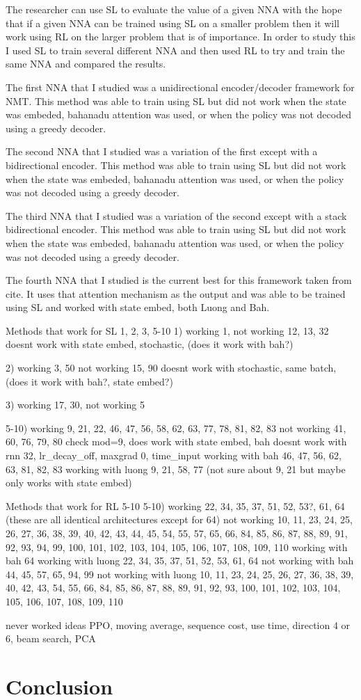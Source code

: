 \documentclass[12pt]{article}
\begin{document}
The researcher can use SL to evaluate the value of a given NNA with the hope that if a given NNA can be trained using SL on a smaller problem then it will work using RL on the larger problem that is of importance. In order to study this I used SL to train several different NNA and then used RL to try and train the same NNA and compared the results.

The first NNA that I studied was a unidirectional encoder/decoder framework for NMT. This method was able to train using SL but did not work when the state was embeded, bahanadu attention was used, or when the policy was not decoded using a greedy decoder.

The second NNA that I studied was a variation of the first except with a bidirectional encoder. This method was able to train using SL but did not work when the state was embeded, bahanadu attention was used, or when the policy was not decoded using a greedy decoder.

The third NNA that I studied was a variation of the second except with a stack bidirectional encoder. This method was able to train using SL but did not work when the state was embeded, bahanadu attention was used, or when the policy was not decoded using a greedy decoder.

The fourth NNA that I studied is the current best for this framework taken from cite. It uses that attention mechanism as the output and was able to be trained using SL and worked with state embed, both Luong and Bah.

Methods that work for SL 1, 2, 3, 5-10
1)
working 1,
not working 12, 13, 32
doesnt work with state embed, stochastic, (does it work with bah?)

2)
working 3, 50
not working 15, 90
doesnt work with stochastic, same batch, (does it work with bah?, state embed?)

3)
working 17, 30,
not working 5

5-10)
working 9, 21, 22, 46, 47, 56, 58, 62, 63, 77, 78, 81, 82, 83
not working 41, 60, 76, 79, 80
check mod=9, does work with state embed, bah
doesnt work with rnn 32, lr_decay_off, maxgrad 0, time_input
working with bah 46, 47, 56, 62, 63, 81, 82, 83
working with luong 9, 21, 58, 77 (not sure about 9, 21 but maybe only works with state embed)

Methods that work for RL 5-10
5-10)
working 22, 34, 35, 37, 51, 52, 53?, 61, 64 (these are all identical architectures except for 64)
not working 10, 11, 23, 24, 25, 26, 27, 36, 38, 39, 40, 42, 43, 44, 45, 54, 55, 57, 65, 66, 84, 85, 86, 87, 88, 89, 91, 92, 93, 94, 99, 100, 101, 102, 103, 104, 105, 106, 107, 108, 109, 110
working with bah 64
working with luong 22, 34, 35, 37, 51, 52, 53, 61, 64
not working with bah 44, 45, 57, 65, 94, 99
not working with luong 10, 11, 23, 24, 25, 26, 27, 36, 38, 39, 40, 42, 43, 54, 55, 66, 84, 85, 86, 87, 88, 89, 91, 92, 93, 100, 101, 102, 103, 104, 105, 106, 107, 108, 109, 110

never worked ideas PPO, moving average, sequence cost, use time, direction 4 or 6, beam search, PCA

\section{Conclusion}


\citet{2016_Mnih}



\end{document}
